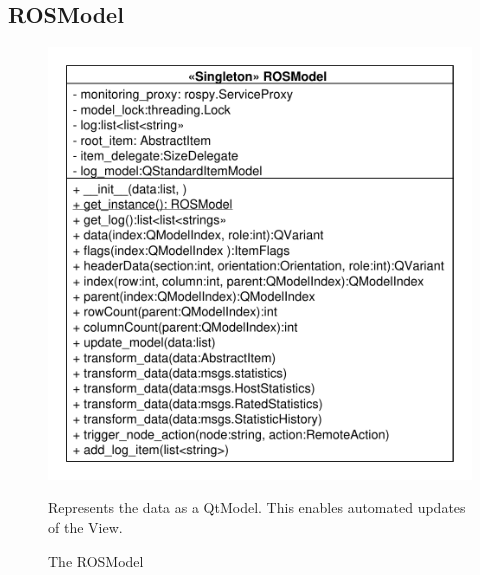 \subsection{ROSModel}
\begin{figure}[htbp]
	\begin{minipage}[t]{7cm}
		\vspace{0pt}
		\centering
		\includegraphics[scale=0.6]{./diagram_pictures/ROSModel.pdf}
		\caption{The ROSModel}
	\end{minipage}
	\hfill
	\begin{minipage}[t]{6cm}
		\vspace{10pt}		
		Represents the data as a QtModel. This enables automated updates of the View.
	\end{minipage}
\end{figure}
